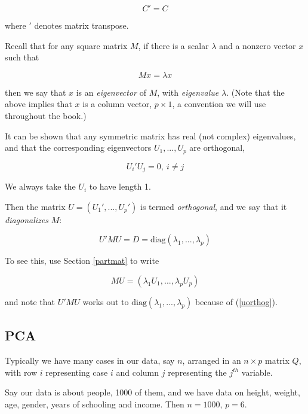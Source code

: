 \begin{equation}
C' = C
\end{equation}

where $'$ denotes matrix transpose.  

Recall that for any square matrix $M$, if there is a scalar $\lambda$
and a nonzero vector $x$ such that 

\begin{equation}
Mx = \lambda x
\end{equation}

then we say that $x$ is an \textit{eigenvector} of $M$, with
\textit{eigenvalue} $\lambda$.  (Note that the above implies that $x$ is
a column vector, $p \times 1$, a convention we will use throughout the
book.)

It can be shown that any symmetric matrix has real (not complex)
eigenvalues, and that the corresponding eigenvectors $U_1,...,U_p$
are orthogonal,

\begin{equation}
\label{uorthog}
U_i' U_j = 0, ~ i \neq j
\end{equation}

We always take the $U_i$ to have length 1.  

Then the matrix $U = (U_1',...,U_p')$ is termed \textit{orthogonal}, and
we say that it \textit{diagonalizes} $M$:

\begin{equation}
\label{diag}
U'MU = D = \textrm{diag}(\lambda_1,...,\lambda_p)
\end{equation}

To see this, use Section \ref{partmat} to write

\begin{equation}
MU = (\lambda_1 U_1,...,\lambda_p U_p)
\end{equation}

and note that $U'MU$ works out to
$\textrm{diag}(\lambda_1,...,\lambda_p)$ because of (\ref{uorthog}).

\subsection{PCA}

Typically we have many cases in our data, say $n$, arranged in an $n
\times p$ matrix $Q$, with row $i$ representing case $i$ and column $j$
representing the $j^{th}$ variable.

Say our data is about people, 1000 of them, and we have data on height,
weight, age, gender, years of schooling and income.  Then $n = 1000$, $p
= 6$.

